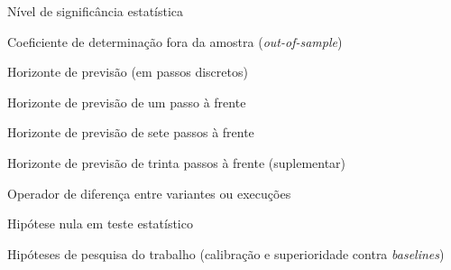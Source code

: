 \begin{simbolos}
    \item[$\alpha$] Nível de significância estatística
    \item[$R^2$] Coeficiente de determinação fora da amostra (\textit{out-of-sample})
    \item[$h$] Horizonte de previsão (em passos discretos)
    \item[$h+1$] Horizonte de previsão de um passo à frente
    \item[$h+7$] Horizonte de previsão de sete passos à frente
    \item[$h+30$] Horizonte de previsão de trinta passos à frente (suplementar)
    \item[$\Delta$] Operador de diferença entre variantes ou execuções
    \item[$H_0$] Hipótese nula em teste estatístico
    \item[$H_1$, $H_{2a}$, $H_{2b}$] Hipóteses de pesquisa do trabalho (calibração e superioridade contra \textit{baselines})
\end{simbolos}
